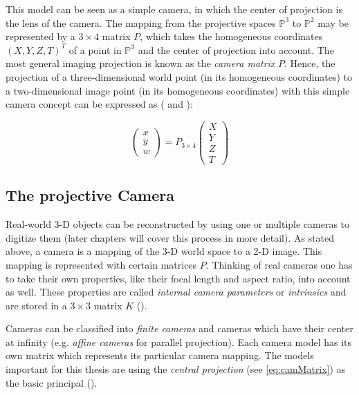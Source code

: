 This model can be seen as a simple camera, in which the center of projection is the lens of the camera. The mapping from the projective spaces $\mathbb{P}^3$ to $\mathbb{P}^2$ may be represented by a $3\times4$ matrix $P$, which takes the homogeneous coordinates $(X,Y,Z,T)^T$ of a point in $\mathbb{P}^3$ and the center of projection into account. The most general imaging projection is known as the \textit{camera matrix} $P$. Hence, the projection of a three-dimensional world point (in its homogeneous coordinates) to a two-dimensional image point (in its homogeneous coordinates) with this simple camera concept can be expressed as (\cite[p.7]{Hartley.2011} and \cite[p.42 et seqq.]{Szeliski.2011}):

\begin{equation} 
 \begin{pmatrix}
  x \\
  y \\
  w
 \end{pmatrix} = P_{3\times4}
 \begin{pmatrix}
  X \\
  Y \\
  Z \\
  T
 \end{pmatrix}\label{eq:camMatrix}
\end{equation}

\subsection{The projective Camera}
Real-world 3-D objects can be reconstructed by using one or multiple cameras to digitize them (later chapters will cover this process in more detail). As stated above, a camera is a mapping of the 3-D world space to a 2-D image. This mapping is represented with certain matrices $P$. Thinking of real cameras one has to take their own properties, like their focal length and aspect ratio, into account as well. These properties are called \textit{internal camera parameters} or \textit{intrinsics} and are stored in a $3\times 3$ matrix $K$ (\cite[p.152 et seq.]{Hartley.2011}).

Cameras can be classified into \textit{finite cameras} and cameras which have their center at infinity (e.g. \textit{affine cameras} for parallel projection). Each camera model has its own matrix which represents its particular camera mapping. The models important for this thesis are using the \textit{central projection} (see \autoref{eq:camMatrix}) as the basic principal (\cite[p.153]{Hartley.2011}).

